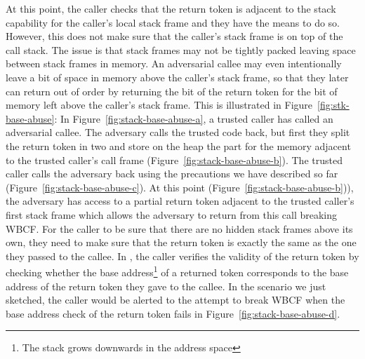 \documentclass[acmsmall,review,anonymous]{acmart}\settopmatter{printfolios=true,printccs=false,printacmref=false}
\begin{document}
At this point, the caller checks that the return token is adjacent to the stack capability for the caller's local stack frame and they have the means to do so.
However, this does not make sure that the caller's stack frame is on top of the call stack.
The issue is that stack frames may not be tightly packed leaving space between stack frames in memory.
An adversarial callee may even intentionally leave a bit of space in memory above the caller's stack frame, so that they later can return out of order by returning the bit of the return token for the bit of memory left above the caller's stack frame.
This is illustrated in Figure~\ref{fig:stk-base-abuse}: In Figure~\ref{fig:stack-base-abuse-a}, a trusted caller has called an adversarial callee.
The adversary calls the trusted code back, but first they split the return token in two and store on the heap the part for the memory adjacent to the trusted caller's call frame (Figure~\ref{fig:stack-base-abuse-b}).
The trusted caller calls the adversary back using the precautions we have described so far (Figure~\ref{fig:stack-base-abuse-c}).
At this point (Figure~\ref{fig:stack-base-abuse-b})), the adversary has access to a partial return token adjacent to the trusted caller's first stack frame which allows the adversary to return from this call breaking WBCF.
For the caller to be sure that there are no hidden stack frames above its own, they need to make sure that the return token is exactly the same as the one they passed to the callee.
In \stktokens{}, the caller verifies the validity of the return token by checking whether the base address\footnote{The stack grows downwards in the address space} of a returned token corresponds to the base address of the return token they gave to the callee.
In the scenario we just sketched, the caller would be alerted to the attempt to break WBCF when the base address check of the return token fails in Figure~\ref{fig:stack-base-abuse-d}.
\end{document}
